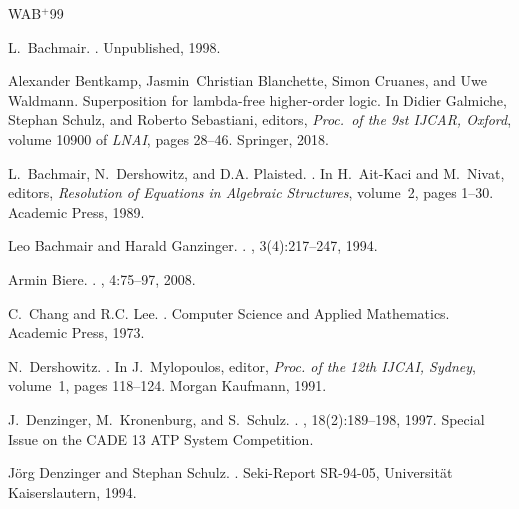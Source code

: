 \documentclass{report}
\begin{document}
%
\newcommand{\etalchar}[1]{$^{#1}$}
\begin{thebibliography}{WAB{\etalchar{+}}99}

L.~Bachmair.
.
\newblock Unpublished, 1998.

Alexander Bentkamp, Jasmin~Christian Blanchette, Simon Cruanes, and Uwe
  Waldmann.
\newblock Superposition for lambda-free higher-order logic.
\newblock In Didier Galmiche, Stephan Schulz, and Roberto Sebastiani, editors,
  {\em Proc.\ of the 9st IJCAR, Oxford}, volume 10900 of {\em LNAI}, pages
  28--46. Springer, 2018.

L.~Bachmair, N.~Dershowitz, and D.A. Plaisted.
.
\newblock In H.~Ait-Kaci and M.~Nivat, editors, {\em Resolution of Equations in
  Algebraic Structures}, volume~2, pages 1--30. Academic Press, 1989.

Leo Bachmair and Harald Ganzinger.
.
, 3(4):217--247, 1994.

Armin Biere.
.
,
  4:75--97, 2008.

C.~Chang and R.C. Lee.
.
\newblock Computer Science and Applied Mathematics. Academic Press, 1973.

N.~Dershowitz.
.
\newblock In J.~Mylopoulos, editor, {\em Proc. of the 12th IJCAI, Sydney},
  volume~1, pages 118--124. Morgan Kaufmann, 1991.

J.~Denzinger, M.~Kronenburg, and S.~Schulz.
.
, 18(2):189--198, 1997.
\newblock Special Issue on the CADE 13 ATP System Competition.

J{\"o}rg Denzinger and Stephan Schulz.
.
\newblock Seki-Report SR-94-05, Universit{\"a}t Kai\-sers\-lau\-tern, 1994.


\end{thebibliography}
\end{document}
